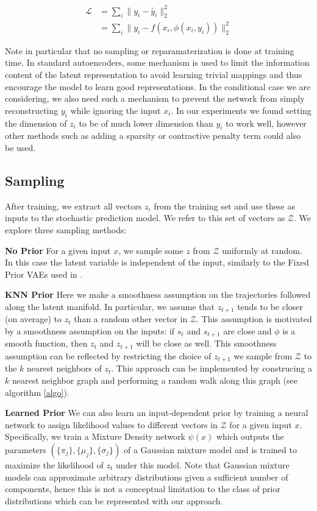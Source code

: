 \documentclass{article}
\begin{document}
\begin{align}
  \mathcal{L} &= \sum_i \|y_i - \tilde{y_i} \|_2^2 \\
  &= \sum_i \|y_i - f(x_i, \phi(x_i, y_i)) \|_2^2
\end{align}

Note in particular that no sampling or reparamaterization is done at training time.
In standard autoencoders, some mechanism is used to limit the information content of the latent representation to avoid learning trivial mappings and thus encourage the model to learn good representations.
In the conditional case we are considering, we also need such a mechanism to prevent the network from simply reconstructing $y_i$ while ignoring the input $x_i$.
In our experiments we found setting the dimension of $z_i$ to be of much lower dimension than $y_i$ to work well, however other methods such as adding a sparsity or contractive penalty term could also be used.


\subsection{Sampling}

After training, we extract all vectors $z_i$ from the training set and use these as inputs to the stochastic prediction model.
We refer to this set of vectors as $\mathcal{Z}$.
We explore three sampling methods:

\textbf{No Prior} For a given input $x$, we sample some $z$ from $\mathcal{Z}$ uniformly at random. In this case the latent variable is independent of the input, similarly to the Fixed Prior VAEs used in \citep{Denton18}.

\textbf{KNN Prior} Here we make a smoothness assumption on the trajectories followed along the latent manifold. In particular, we assume that $z_{t+1}$ tends to be closer (on average) to $z_t$ than a random other vector in $\mathcal{Z}$. This assumption is motivated by a smoothness assumption on the inputs: if $s_t$ and $s_{t+1}$ are close and $\phi$ is a smooth function, then $z_t$ and $z_{t+1}$ will be close as well. This smoothness assumption can be reflected by restricting the choice of $z_{t+1}$ we sample from $\mathcal{Z}$ to the $k$ nearest neighbors of $z_t$.
This approach can be implemented by construcing a $k$ nearest neighbor graph and performing a random walk along this graph (see algorithm \ref{algo}).

\textbf{Learned Prior} We can also learn an input-dependent prior by training a neural network to assign likelihood values to different vectors in $\mathcal{Z}$ for a given input $x$. Specifically, we train a Mixture Density network \citep{mixture-density-networks} $\psi(x)$ which outputs the parameters $(\{\pi_j\}, \{\mu_j\}, \{\sigma_j\})$ of a Gaussian mixture model and is trained to maximize the likelihood of $z_t$ under this model. Note that Gaussian mixture models can approximate arbitrary distributions given a sufficient number of components, hence this is not a conceptual limitation to the class of prior distributions which can be represented with our approach.
\end{document}
